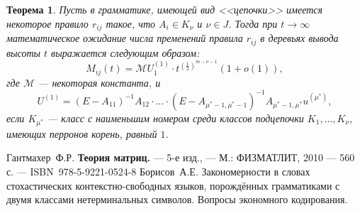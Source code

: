 \documentclass{article}
\newtheorem{theorem}{Теорема}
\begin{document}
\begin{theorem}
    Пусть в грамматике, имеющей вид <<цепочки>> имеется некоторое правило $r_{ij}$ такое, что $A_i \in K_\nu$ и $\nu \in J$. Тогда при $t \rightarrow \infty$ математическое ожидание числа пременений правила $r_{ij}$ в деревьях вывода высоты $t$ выражается следующим образом:
    \begin{equation}
        M_{ij}(t) = \mathcal{M} U^{(1)}_1 \cdot t^{ \left( \frac{1}{2} \right)^{m - \nu - 1} } (1 + o(1)),
    \end{equation}
    где $\mathcal{M}$ --- некоторая константа, и
    \begin{equation*}
        U^{(1)} = (E - A_{11})^{-1} A_{12} \cdot \ldots \cdot (E - A_{\mu^*-1,\mu^*-1})^{-1} A_{\mu^*-1,\mu^*} u^{(\mu^*)},
    \end{equation*}
    если $K_{\mu^*}$ --- класс с наименьшим номером среди классов подцепочки $K_1, \ldots, K_\nu$, имеющих перронов корень, равный $1$.
\end{theorem}

\begin{thebibliography}{99}
        Гантмахер~Ф.Р. \textbf{Теория матриц.} --- 5-е изд., --- М.: ФИЗМАТЛИТ, 2010 --- 560 с. --- ISBN~978-5-9221-0524-8
        Борисов~А.Е. Закономерности в словах стохастических контекстно-свободных языков, порождённых грамматиками с двумя классами нетерминальных символов. Вопросы экономного кодирования.
\end{thebibliography}
\end{document}
